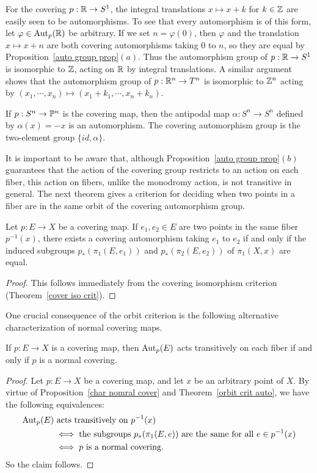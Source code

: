 \begin{example}
For the covering $p:\R\to S^1$, the integral translations $x\mapsto x+k$ for $k\in\Z$ are easily seen to be automorphisms. To see that every automorphism is of this form, let $\varphi\in\Aut_p(\R)$ be arbitrary. If we set $n=\varphi(0)$, then $\varphi$ and the translation $x\mapsto x+n$ are both covering automorphisms taking $0$ to $n$, so they are equal by Proposition~\ref{auto group prop}$(a)$. Thus the automorphism group of $p:\R\to S^1$ is isomorphic to $\Z$, acting on $\R$ by integral translations. A similar argument shows
that the automorphism group of $p:\R^n\to T^n$ is isomorphic to $\Z^n$ acting by $(x_1,\cdots,x_n)\mapsto(x_1+k_1,\cdots,x_n+k_n)$.
\end{example}
\begin{example}
If $p:S^n\to\P^n$ is the covering map, then the antipodal map $\alpha:S^n\to S^n$ defined by $\alpha(x)=-x$ is an automorphism. The covering automorphism group is the two-element group $\{id,\alpha\}$.
\end{example}
It is important to be aware that, although Proposition~\ref{auto group prop}$(b)$ guarantees that the action of the covering group restricts to an action on each fiber, this action on fibers,
unlike the monodromy action, is not transitive in general. The next theorem gives a criterion for deciding when two points in a fiber are in the same orbit of the covering automorphism group.
\begin{theorem}\label{orbit crit auto}
Let $p:E\to X$ be a covering map. If $e_1,e_2\in E$ are two points in the same fiber $p^{-1}(x)$, there exists a covering automorphism taking $e_1$ to $e_2$ if and only if the induced subgroups $p_*(\pi_1(E,e_1))$ and $p_*(\pi_2(E,e_2))$ of $\pi_1(X,x)$ are equal.
\end{theorem}
\begin{proof}
This follows immediately from the covering isomorphism criterion (Theorem~\ref{cover iso crit}).
\end{proof}
One crucial consequence of the orbit criterion is the following alternative characterization
of normal covering maps.
\begin{corollary}\label{normal cover iff}
If $p:E\to X$ is a covering map, then $\Aut_p(E)$ acts transitively on each fiber if and only if $p$ is a normal covering.
\end{corollary}
\begin{proof}
Let $p:E\to X$ be a covering map, and let $x$ be an arbitrary point of $X$. By virtue of Proposition~\ref{char nomral cover} and Theorem~\ref{orbit crit auto}, we have the following equivalences:
\begin{align*}
\Aut_p(E)&\text{ acts transitively on }p^{-1}(x)\\
&\iff\text{the subgroups }p_*(\pi_1(E,e))\text{ are the same for all }e\in p^{-1}(x)\\
&\iff p\text{ is a normal covering}.
\end{align*}
So the claim follows.
\end{proof}

